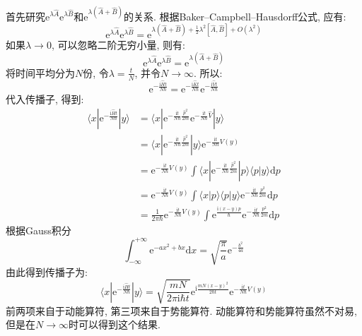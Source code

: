         首先研究$\mathrm{e}^{\lambda \hat{A}}\mathrm{e}^{\lambda \hat{B}}$和$\mathrm{e}^{\lambda (\hat{A}+\hat{B})}$的关系. 根据Baker–Campbell–Hausdorff公式, 应有:
        \begin{equation}
            \mathrm{e}^{\lambda \hat{A}} \mathrm{e}^{\lambda \hat{B}} = \mathrm{e}^{\lambda (\hat{A}+\hat{B}) + \frac 12 \lambda^2 [\hat{A},\hat{B}] + O(\lambda^2)}
        \end{equation}
        如果$\lambda \to 0$, 可以忽略二阶无穷小量, 则有:
        \begin{equation}
            \mathrm{e}^{\lambda \hat{A}} \mathrm{e}^{\lambda \hat{B}} = \mathrm{e}^{\lambda (\hat{A}+\hat{B})}
        \end{equation}
        将时间平均分为$N$份, 令$\lambda = \frac tN$, 并令$N \to \infty$. 所以:
        \begin{equation}
            \mathrm{e}^{-\frac {\mathrm{i}\hat{H}t}{N\hbar}} = \mathrm{e}^{-\frac {\mathrm{i}\hat{K}t}{N\hbar}} \mathrm{e}^{-\frac {\mathrm{i}\hat{V}t}{N\hbar}}
        \end{equation}
        代入传播子, 得到:
        \begin{equation}\begin{aligned}
            \langle x | \mathrm{e}^{-\frac {\mathrm{i}\hat{H}t}{N\hbar}} | y \rangle &= \langle x | \mathrm{e}^{-\frac {\mathrm{i}t}{N\hbar}\frac {\hat{p}^2}{2m}} 
            \mathrm{e}^{-\frac {\mathrm{i}t}{N\hbar}\hat{V}} |y \rangle\\
            &= \langle x | \mathrm{e}^{- \frac{\mathrm{i}t}{N\hbar} \frac{\hat{p}^2}{2m}} |y \rangle \mathrm{e}^{-\frac {\mathrm{i}t}{N\hbar}V(y)} \\
            &= \mathrm{e}^{-\frac {\mathrm{i}t}{N\hbar}V(y)} \int \langle x | \mathrm{e}^{-\frac {\mathrm{i}t}{N\hbar}\frac {\hat{p}^2}{2m}} |p \rangle \langle p |y \rangle \mathrm{d}p \\
            &= \mathrm{e}^{-\frac {\mathrm{i}t}{N\hbar}V(y)} \int \langle x|p \rangle \langle p|y \rangle \mathrm{e}^{-\frac {\mathrm{i}t}{N\hbar}\frac {p^2}{2m}} \mathrm{d}p\\
            &= \frac 1{2\pi \hbar} \mathrm{e}^{-\frac {\mathrm{i}t}{N\hbar}V(y)} \int \mathrm{e}^{\frac {\mathrm{i}(x-y)p}{\hbar}} \mathrm{e}^{-\frac {\mathrm{i}t}{N\hbar}\frac {p^2}{2m}} \mathrm{d} p
        \end{aligned}\end{equation}
        根据Gauss积分
        \begin{equation}
            \int_{-\infty}^{+\infty} \mathrm{e}^{-ax^2+bx} \mathrm{d}x = \sqrt{\frac {\pi}a} \mathrm{e}^{-\frac {b^2}{4a}}
        \end{equation}
        由此得到传播子为:
        \begin{equation}
            \langle x | \mathrm{e}^{-\frac {\mathrm{i}\hat{H}t}{N\hbar}} | y \rangle = \sqrt{\frac {mN}{2\pi\mathrm{i} \hbar t}} \mathrm{e}^{\mathrm{i}\frac {mN(x-y)^2}{2\hbar t}}\mathrm{e}^{-\frac {\mathrm{i}t}{N\hbar} V(y)}
        \end{equation}
        前两项来自于动能算符, 第三项来自于势能算符. 动能算符和势能算符虽然不对易, 但是在$N \to \infty$时可以得到这个结果. 

